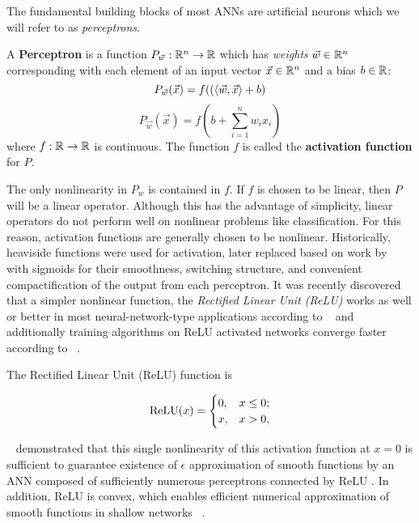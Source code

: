 The fundamental building blocks of most ANNs are artificial neurons which we will refer to as \emph{perceptrons}.

\begin{definition}{A \textbf{Perceptron} is  }
\label{perceptron}
a function $P_{\vec w}: \mathbb{R}^n \to \mathbb{R}$ which has \emph{weights} $\vec
w \in \mathbb{R}^n$ corresponding with each element of an input vector $\vec
x\in \mathbb{R}^n$ and a bias $b \in \mathbb{R}$:
\[P_{\vec w}(\vec x) = f(\left(\left\langle \vec w,\vec x \right\rangle + b\right)\]
\[P_{\vec w}(\vec x) = f\left(b + \sum_{i = 1}^n w_i x_i\right)\]
where $f: \mathbb{R} \to \mathbb{R}$ is continuous. The function $f$ is called the \textbf{activation function} for $P$. 
\end{definition}


The only nonlinearity in $P_w$ is contained in $f$. If $f$ is chosen
to be linear, then $P$ will be a linear operator. Although this has
the advantage of simplicity, linear operators do not perform well on
nonlinear problems like classification. For this reason, activation
functions are generally chosen to be nonlinear. Historically,
heaviside functions were used for activation, later replaced based on
work by ~\citet{malik1990preattentive} with sigmoids for their smoothness, switching structure, and convenient
compactification of the output from each perceptron.  It was recently
discovered that a simpler nonlinear function, the \emph{Rectified
  Linear Unit (ReLU)} works as well or better in most
neural-network-type applications according to ~\citet{glorot2011deep}
and additionally training algorithms on ReLU activated networks
converge faster according to ~\citet{nair_rectified_nodate}. 

\begin{definition}{The Rectified Linear Unit (ReLU) function is}
\label{relu}

  \[\text{ReLU}(x) = \begin{cases} 0, & x \leq 0;\\
      x, & x > 0,\end{cases}\]
\end{definition}


~\citet{petersen2018optimal} demonstrated that this single nonlinearity of this activation function
at $x = 0$ is sufficient to guarantee existence of $\epsilon$ approximation of smooth functions by an ANN composed of sufficiently numerous perceptrons connected by ReLU . In addition, ReLU is convex, which enables efficient numerical approximation of smooth functions in shallow networks ~\citep{li2017convergence}.  


